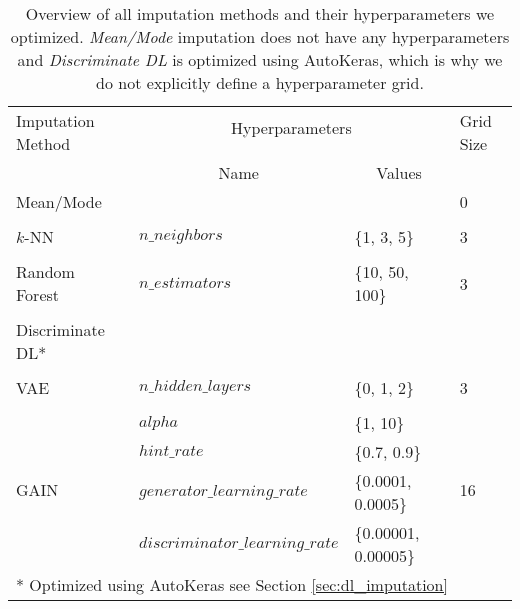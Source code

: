 \begin{table}[]
	\centering
	\begin{tabular}{@{}llll@{}}
		\toprule
		\multirow{2}{*}{Imputation Method} & \multicolumn{2}{c}{Hyperparameters}                          & \multirow{2}{*}{Grid Size} \\
		\\[-0.75em]
		& \multicolumn{1}{c}{Name}        & \multicolumn{1}{c}{Values} &                            \\ \midrule
		Mean/Mode                         &                                 &                            & 0                          \\
		\\[-0.75em]
		$k$-NN                             & $n\_neighbors$                  & \{1, 3, 5\}                & 3                          \\
		\\[-0.75em]
		Random Forest                      & $n\_estimators$                 & \{10, 50, 100\}            & 3                          \\
		\\[-0.75em]
		Discriminate DL*                   &                                 &                            &                            \\
		\\[-0.75em]
		VAE                                & $n\_hidden\_layers$             & \{0, 1, 2\}                & 3                          \\
		\\[-0.75em]
		\multirow{4}{*}{GAIN}              & $alpha$                         & \{1, 10\}                  & \multirow{4}{*}{16}        \\
		& $hint\_rate$                    & \{0.7, 0.9\}               &                            \\
		& $generator\_learning\_rate$     & \{0.0001, 0.0005\}         &                            \\
		& $discriminator\_learning\_rate$ & \{0.00001, 0.00005\}       &                            \\ \midrule
		\multicolumn{4}{l}{* Optimized using AutoKeras see Section \ref{sec:dl_imputation}}
	\end{tabular}
	\caption{Overview of all imputation methods and their hyperparameters we optimized. \emph{Mean/Mode} imputation does not have any hyperparameters and \emph{Discriminate DL} is optimized using AutoKeras, which is why we do not explicitly define a hyperparameter grid.}
	\label{tab:HPO}
\end{table}



